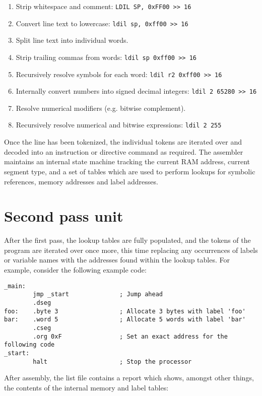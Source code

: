 \documentclass[12pt,twoside]{report}
\begin{document}
\begin{enumerate}
\item Strip whitespace and comment: \texttt{LDIL SP, 0xFF00 >> 16}
\item Convert line text to lowercase: \texttt{ldil sp, 0xff00 >> 16}
\item Split line text into individual words.
\item Strip trailing commas from words: \texttt{ldil sp 0xff00 >> 16}
\item Recursively resolve symbols for each word: \texttt{ldil r2 0xff00 >> 16}
\item Internally convert numbers into signed decimal integers: \texttt{ldil 2 65280 >> 16}
\item Resolve numerical modifiers (e.g. bitwise complement).
\item Recursively resolve numerical and bitwise expressions: \texttt{ldil 2 255}
\end{enumerate}

\noindent
Once the line has been tokenized, the individual tokens are iterated
over and decoded into an instruction or directive command as
required. The assembler maintains an internal state machine tracking
the current RAM address, current segment type, and a set of tables
which are used to perform lookups for symbolic references, memory
addresses and label addresses.

\section{Second pass unit}

After the first pass, the lookup tables are fully populated, and the
tokens of the program are iterated over once more, this time replacing
any occurrences of labels or variable names with the addresses found
within the lookup tables. For example, consider the following example
code:

\begin{verbatim}
_main:
        jmp _start              ; Jump ahead
        .dseg
foo:    .byte 3                 ; Allocate 3 bytes with label 'foo'
bar:    .word 5                 ; Allocate 5 words with label 'bar'
        .cseg
        .org 0xF                ; Set an exact address for the following code
_start:
        halt                    ; Stop the processor
\end{verbatim}

\noindent
After assembly, the list file contains a report which shows, amongst
other things, the contents of the internal memory and label tables:
\end{document}
